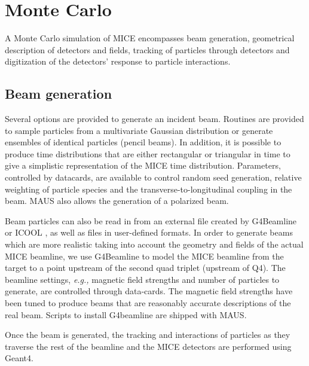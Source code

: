 \documentclass[11pt]{article}
\begin{document}

\section{Monte Carlo}\label{sec:mc}
A Monte Carlo simulation of MICE encompasses beam generation, geometrical description of detectors  and fields, tracking of particles through detectors and digitization of the detectors' response to particle interactions. 

\subsection{Beam generation}\label{sec:beam}
Several options are provided to generate an incident beam.  Routines are provided to sample particles from a multivariate Gaussian distribution or generate ensembles of identical particles (pencil beams). In addition, it is possible to produce time distributions that are either rectangular or triangular in time to give a simplistic representation of the MICE time distribution. Parameters, controlled by datacards, are available to control random seed generation,  relative weighting of particle species and the transverse-to-longitudinal coupling in the beam. MAUS also allows the generation of a polarized beam. 

Beam particles can also be read in from an external file created by G4Beamline \cite{G4Beamline} or ICOOL \cite{ICOOL}, as well as files in user-defined formats. In order to generate beams which are more realistic taking into account the geometry and fields of the actual MICE beamline, we use G4Beamline to model the MICE beamline from the target to a point upstream of the second quad triplet (upstream of Q4).  The beamline settings, \textit{e.g.,} magnetic field strengths and number of particles to generate, are controlled through data-cards. The magnetic field strengths have been tuned to produce beams that are reasonably accurate descriptions of the real beam. Scripts to install G4beamline are shipped with MAUS. 

Once the beam is generated, the tracking and interactions of particles as they traverse the rest of the beamline and the MICE detectors  are performed using Geant4.
\end{document}

